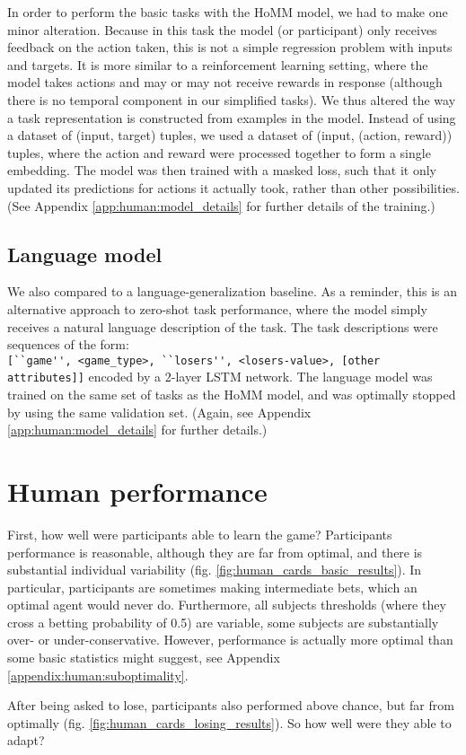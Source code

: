 In order to perform the basic tasks with the HoMM model, we had to make one minor alteration. Because in this task the model (or participant) only receives feedback on the action taken, this is not a simple regression problem with inputs and targets. It is more similar to a reinforcement learning setting, where the model takes actions and may or may not receive rewards in response (although there is no temporal component in our simplified tasks). We thus altered the way a task representation is constructed from examples in the model. Instead of using a dataset of (input, target) tuples, we used a dataset of (input, (action, reward)) tuples, where the action and reward were processed together to form a single embedding. The model was then trained with a masked loss, such that it only updated its predictions for actions it actually took, rather than other possibilities. (See Appendix \ref{app:human:model_details} for further details of the training.) \par

\subsection{Language model}

We also compared to a language-generalization baseline. As a reminder, this is an alternative approach to zero-shot task performance, where the model simply receives a natural language description of the task. The task descriptions were sequences of the form:\\\verb|[``game'', <game_type>, ``losers'', <losers-value>, [other attributes]]| encoded by a 2-layer LSTM network. The language model was trained on the same set of tasks as the HoMM model, and was optimally stopped by using the same validation set. (Again, see Appendix \ref{app:human:model_details} for further details.)


\section{Human performance}
First, how well were participants able to learn the game? Participants performance is reasonable, although they are far from optimal, and there is substantial individual variability (fig. \ref{fig:human_cards_basic_results}). In particular, participants are sometimes making intermediate bets, which an optimal agent would never do. Furthermore, all subjects thresholds (where they cross a betting probability of 0.5) are variable, some subjects are substantially over- or under-conservative. However, performance is actually more optimal than some basic statistics might suggest, see Appendix \ref{appendix:human:suboptimality}. \par 
After being asked to lose, participants also performed above chance, but far from optimally (fig. \ref{fig:human_cards_losing_results}). So how well were they able to adapt? 


